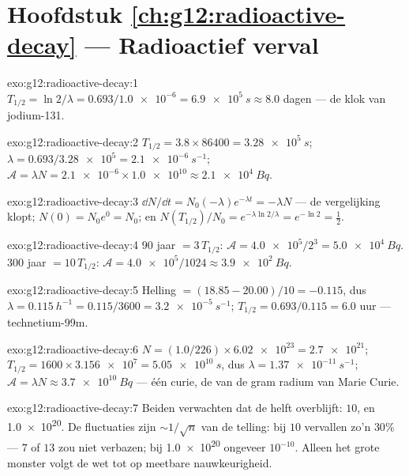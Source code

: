 \section*{Hoofdstuk \ref{ch:g12:radioactive-decay} --- Radioactief verval}

\begin{solution}{exo:g12:radioactive-decay:1}
$T_{1/2} = \ln 2/\lambda = 0.693/\num{1.0e-6} = \qty{6.9e5}{s} \approx 8.0$
dagen --- de klok van jodium-131.
\end{solution}

\begin{solution}{exo:g12:radioactive-decay:2}
$T_{1/2} = 3.8 \times \num{86400} = \qty{3.28e5}{s}$;
$\lambda = 0.693/\num{3.28e5} = \qty{2.1e-6}{s^{-1}}$;
$\mathcal A = \lambda N = \num{2.1e-6} \times \num{1.0e10} \approx
\qty{2.1e4}{Bq}$.
\end{solution}

\begin{solution}{exo:g12:radioactive-decay:3}
$\dd N/\dd t = N_0(-\lambda)e^{-\lambda t} = -\lambda N$ --- de vergelijking
klopt; $N(0) = N_0 e^0 = N_0$; en
$N(T_{1/2})/N_0 = e^{-\lambda \ln 2/\lambda} = e^{-\ln 2} = \tfrac12$.
\end{solution}

\begin{solution}{exo:g12:radioactive-decay:4}
$90$ jaar $= 3\,T_{1/2}$: $\mathcal A = \num{4.0e5}/2^3 = \qty{5.0e4}{Bq}$.
$300$ jaar $= 10\,T_{1/2}$: $\mathcal A = \num{4.0e5}/1024 \approx
\qty{3.9e2}{Bq}$.
\end{solution}

\begin{solution}{exo:g12:radioactive-decay:5}
Helling $= (18.85 - 20.00)/10 = -0.115$, dus
$\lambda = \qty{0.115}{h^{-1}} = 0.115/3600 = \qty{3.2e-5}{s^{-1}}$;
$T_{1/2} = 0.693/0.115 = 6.0$ uur --- technetium-99m.
\end{solution}

\begin{solution}{exo:g12:radioactive-decay:6}
$N = (1.0/226) \times \num{6.02e23} = \num{2.7e21}$;
$T_{1/2} = 1600 \times \num{3.156e7} = \qty{5.05e10}{s}$, dus
$\lambda = \qty{1.37e-11}{s^{-1}}$; $\mathcal A = \lambda N \approx
\qty{3.7e10}{Bq}$ --- één curie, de  van de gram radium van Marie
Curie.
\end{solution}

\begin{solution}{exo:g12:radioactive-decay:7}
Beiden verwachten dat de helft overblijft: $10$, en \num{1.0e20}. De
fluctuaties zijn $\sim 1/\sqrt{n}$ van de telling: bij $10$ vervallen zo'n
$30\%$ --- $7$ of $13$ zou niet verbazen; bij \num{1.0e20} ongeveer
$10^{-10}$. Alleen het grote monster volgt de wet tot op meetbare
nauwkeurigheid.
\end{solution}

